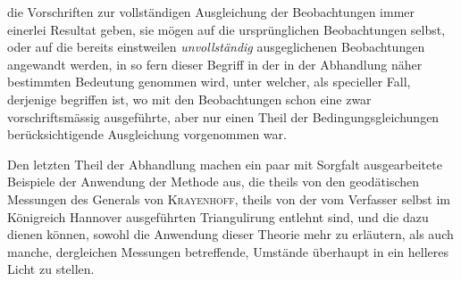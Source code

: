 die Vorschriften zur vollständigen Ausgleichung der Beobachtungen immer einerlei Resultat geben, sie mögen auf die ursprünglichen Beobachtungen selbst, oder auf die bereits einstweilen \textit{unvollständig} ausgeglichenen Beobachtungen angewandt werden, in so fern dieser Begriff in der in der Abhandlung näher bestimmten Bedeutung genommen wird, unter welcher, als specieller Fall, derjenige begriffen ist, wo mit den Beobachtungen schon eine zwar vorschriftsmässig ausgeführte, aber nur einen Theil der Bedingungsgleichungen berücksichtigende Ausgleichung vorgenommen war.

Den letzten Theil der Abhandlung machen ein paar mit Sorgfalt ausgearbeitete Beispiele der Anwendung der Methode aus, die theils von den geodätischen Messungen des Generals von \textsc{Krayenhoff}, theils von der vom Verfasser selbst im Königreich Hannover ausgeführten Triangulirung entlehnt sind, und die dazu dienen können, sowohl die Anwendung dieser Theorie mehr zu erläutern, als auch manche, dergleichen Messungen betreffende, Umstände überhaupt in ein helleres Licht zu stellen.

